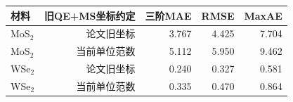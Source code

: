 \begin{tabular}{lrrrr}
\toprule
材料 & 旧QE+MS坐标约定 & 三阶MAE & RMSE & MaxAE \\
\midrule
MoS$_2$ & 论文旧坐标 & 3.767 & 4.425 & 7.704 \\
MoS$_2$ & 当前单位范数 & 5.112 & 5.950 & 9.462 \\
WSe$_2$ & 论文旧坐标 & 0.240 & 0.327 & 0.581 \\
WSe$_2$ & 当前单位范数 & 0.335 & 0.470 & 0.864 \\
\bottomrule
\end{tabular}
